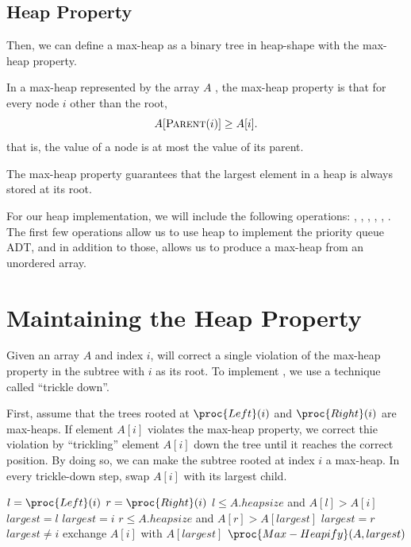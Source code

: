 \subsection{Heap Property}

Then, we can define a max-heap as a binary tree in heap-shape with the max-heap property.

\begin{definition}  
    In a max-heap represented by the array $A$ , the max-heap property is that for every node $i$ other than the root,
    \[
        A[\textsc{Parent}(i)] \geq A[i]
    .\]
    that is, the value of a node is at most the value of its parent.
\end{definition}

The max-heap property guarantees that the largest element in a heap is always stored at its root.

For our heap implementation, we will include the following operations: , , , , , . The first few operations allow us to use heap to implement the priority queue ADT, and in addition to those,  allows us to produce a max-heap from an unordered array.

\section{Maintaining the Heap Property}

Given an array $A$ and index $i$,  will correct a single violation of the max-heap property in the subtree with $i$ as its root. To implement , we use a technique called ``trickle down''.

First, assume that the trees rooted at $\proc{Left}(i)$ and $\proc{Right}(i)$ are max-heaps. If element $A[i]$ violates the max-heap property, we correct thie violation by ``trickling'' element $A[i]$ down the tree until it reaches the correct position. By doing so, we can make the subtree rooted at index $i$ a max-heap. In every trickle-down step, swap $A[i]$ with its largest child.

\begin{codebox}
    \li $l = \proc{Left}(i)$
    \li $r = \proc{Right}(i)$ 
    \li \If $l \leq A.heapsize$ and $A[l] > A[i]$
    \li \Then $largest = l$
    \li \Else $largest = i$
    \End
    \li \If $r \leq A.heapsize$ and $A[r] > A[largest]$ 
    \li \Then $largest = r$
    \End
    \li \If $largest \neq i$
    \li \Then exchange $A[i]$ with $A[largest]$
    \li       $\proc{Max-Heapify}(A,largest)$
    \End 
\end{codebox}

